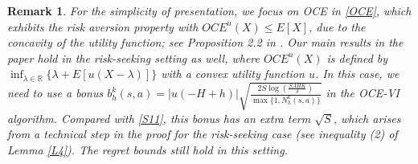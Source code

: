 \documentclass[11pt]{article}
\newtheorem{remark}{Remark}
\newcommand{\1}{\mathbbm{1}}
\newcommand{\gao}[1]{\textcolor{blue}{{#1}}} %
\begin{document}
\begin{remark}
For the simplicity of presentation, we focus on OCE in \eqref{OCE}, which exhibits the risk aversion property with $OCE^u(X) \le E[X]$, due to the concavity of the utility function; see Proposition 2.2 in \cite{ben2007old}. Our main results in the paper hold in the risk-seeking setting as well, where $OCE^u(X)$ is defined by $\inf_{\lambda\in \mathbb{R}}\{\lambda+E[u(X-\lambda)]\}$ with a convex utility function $u$. In this case, we need to use a bonus $b_h^k(s,a)=\vert u(-H+h)\vert \sqrt{\frac{2S\log\left(\frac{SAHK}{\delta}\right)}{\max\{1,N_h^k(s,a)\}}}$ in the OCE-VI algorithm. Compared with \eqref{S11}, this bonus has an extra term $\sqrt{S}$, which arises from a technical step in the proof for the risk-seeking case (see inequality (2) of Lemma \ref{L4}). The regret bounds still hold in this setting. 
\end{remark}




\end{document}
